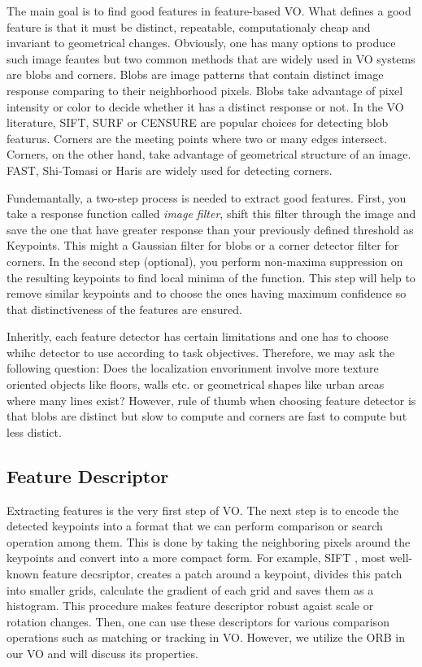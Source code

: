 \documentclass[a4paper]{report}
\numberwithin{figure}{section}
\begin{document}
The main goal is to find good features in feature-based VO. 
What defines a good feature is that it must be distinct, 
repeatable, computationaly cheap and invariant to geometrical changes. 
Obviously, one has many options to produce such image 
feautes but two common methods that are widely used in VO systems are 
blobs and corners. 
Blobs are image patterns that contain distinct image response comparing to their 
neighborhood pixels. Blobs take advantage of pixel intensity or color to 
decide whether it has a distinct response or not.
In the VO literature, SIFT\cite{}, SURF\cite{} or CENSURE\cite{} are popular 
choices for detecting blob featurus.
Corners are the meeting points where two or many edges intersect. Corners, 
on the other hand, 
take advantage of geometrical structure of an image. FAST\cite{}, Shi-Tomasi or 
Haris\cite{} are widely used for detecting corners.

Fundemantally, a two-step process is needed to extract good features. 
First, you take a response function called \textit{image filter}, 
shift this filter through the image and save the one that have greater 
response than your previously defined threshold as Keypoints. 
This might a Gaussian filter for blobs or a 
corner detector filter for corners. In the second step (optional), 
you perform non-maxima 
suppression on the resulting keypoints to find local minima of the function. 
This step will help to remove similar keypoints and to choose the ones having 
maximum confidence so that distinctiveness of the features are ensured.

Inheritly, each feature detector has certain limitations and one has to 
choose whihc detector to use according to task objectives. Therefore, we may ask 
the following question: 
Does the localization envorinment involve more texture oriented objects like 
floors, walls etc. or geometrical shapes like urban areas where many lines 
exist?
However, rule of thumb when choosing feature detector is that blobs 
are distinct but slow to compute and corners are fast to compute but less 
distict. 

\subsection{Feature Descriptor} \label{sb_sc_feature_descriptor}

Extracting features is the very first step of VO. The next step is to 
encode the detected keypoints into a format that we can perform comparison 
or search operation among them. This is done by taking the neighboring pixels 
around the keypoints and convert into a more compact form. For example, SIFT 
, most well-known feature decsriptor, 
creates a patch around a keypoint, divides this patch into smaller grids,
calculate the gradient of each grid and 
saves them as a histogram.
This procedure makes feature descriptor 
robust agaist scale or rotation changes. Then, one can use these descriptors for 
various comparison operations such as matching or tracking in VO. However, we 
utilize the ORB in our VO and will discuss its properties.
\end{document}
